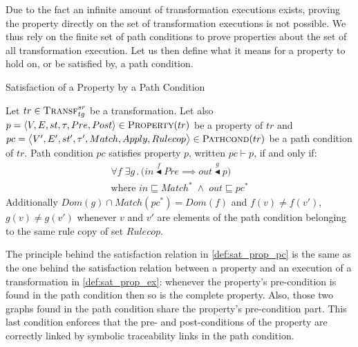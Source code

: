 Due to the fact an infinite amount of transformation executions exists, proving the property directly on the set of transformation executions is not possible. We thus rely on the finite set of path conditions to prove properties about the set of all transformation execution. Let us then define what it means for a property to hold on, or be satisfied by, a path condition.  

\begin{definition}{Satisfaction of a Property by a Path Condition\\}
\label{def:sat_prop_pc}

Let $tr\in \textsc{Transf}^{sr}_{tg}$ be a transformation. Let also $p = \langle V,E,st,\tau,\\Pre,Post\rangle \in \textsc{Property}(tr)$ be a property of $tr$ and $pc=\big\langle V',E',\\st',\tau', Match,Apply,Rulecop\big\rangle\in \textsc{Pathcond}(tr)$ be a path condition of $tr$. Path condition $pc$ satisfies property $p$, written $pc \vdash p$, if and only if:
\begin{multline*}
\forall f\; \exists g\,.\,\big(in\stackrel{f}{\blacktriangleleft} Pre \implies out \stackrel{g}\blacktriangleleft p\big)\\
\text{where } in \sqsubseteq Match^{*} \;\land\; out \sqsubseteq pc^{*}
\end{multline*}
Additionally $Dom(g)\cap Match(pc^{*}) = Dom(f)$ and $f(v)\neq f(v')$, $g(v)\neq g(v')$ whenever $v$ and $v'$ are elements of the path condition belonging to the same rule copy of set $Rulecop$.

\end{definition}

The principle behind the satisfaction relation in \cref{def:sat_prop_pc} is the same as the one behind the satisfaction relation between a property and an execution of a transformation in \cref{def:sat_prop_ex}: whenever the property's pre-condition is found in the path condition then so is the complete property. Also, those two graphs found in the path condition share the property's pre-condition part. This last condition enforces that the pre- and post-conditions of the property are correctly linked by symbolic traceability links in the path condition.

